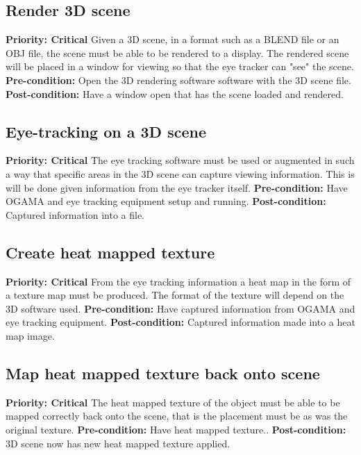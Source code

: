 \subsection{Render 3D scene}
    \textbf{Priority: Critical}\newline
    Given a 3D scene, in a format such as a BLEND file or an OBJ file, the scene must be able to be rendered to a display. The rendered scene will be placed in a window for viewing so that the eye tracker can "see" the scene.\newline
    \textbf{Pre-condition: }
    Open the 3D rendering software software with the 3D scene file.\newline
    \textbf{Post-condition: }
    Have a window open that has the scene loaded and rendered.
    
\subsection{Eye-tracking on a 3D scene}
    \textbf{Priority: Critical}\newline
    The eye tracking software must be used or augmented in such a way that specific areas in the 3D scene can capture viewing information. This is will be done given information from the eye tracker itself.\newline
    \textbf{Pre-condition: }
    Have OGAMA and eye tracking equipment setup and running.\newline
    \textbf{Post-condition: }
    Captured information into a file.
    
\subsection{Create heat mapped texture}
    \textbf{Priority: Critical}\newline
    From the eye tracking information a heat map in the form of a texture map must be produced. The format of the texture will depend on the 3D software used.\newline
    \textbf{Pre-condition: }
    Have captured information from OGAMA and eye tracking equipment.\newline
    \textbf{Post-condition: }
    Captured information made into a heat map image.
    
\subsection{Map heat mapped texture back onto scene}
    \textbf{Priority: Critical}\newline
    The heat mapped texture of the object must be able to be mapped correctly back onto the scene, that is the placement must be as was the original texture.\newline
    \textbf{Pre-condition: }
    Have heat mapped texture..\newline
    \textbf{Post-condition: }
    3D scene now has new heat mapped texture applied.
    
